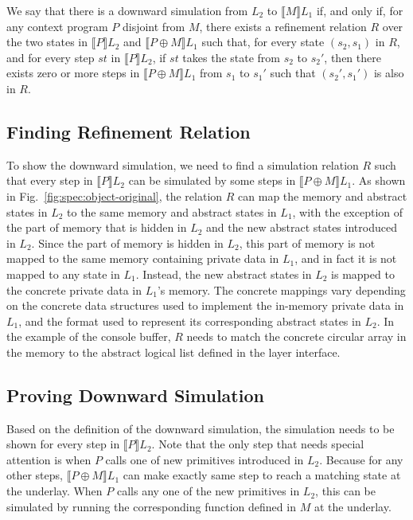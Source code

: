 \begin{definition}
We say that there is a downward simulation from $L_2$ to
$\llbracket{}M\rrbracket{}L_1$ if, and only if, for any
context program $P$ disjoint from $M$, there exists a refinement relation
$R$ over the two states in $\llbracket{}P\rrbracket{}L_2$ and
$\llbracket{}{P \oplus M}\rrbracket{}L_1$ such that, for
every state $(s_2, s_1)$ in $R$, and for every step $st$ in $\llbracket{}P\rrbracket{}L_2$,
if $st$ takes the state from $s_2$ to $s_2'$, then there exists
zero or more steps in $\llbracket{}{P \oplus M}\rrbracket{}L_1$ from
$s_1$ to $s_1'$ such that $(s_2', s_1')$ is also in $R$.
\end{definition}

\subsection{Finding Refinement Relation}

To show the downward simulation, we need to find a simulation relation $R$
such that every step in $\llbracket{}P\rrbracket{}L_2$ can be simulated by
some steps in $\llbracket{}{P \oplus M}\rrbracket{}L_1$.
As shown in Fig.~\ref{fig:spec:object-original}, the relation $R$ can
map the memory and abstract states in $L_2$ to the same memory and abstract
states in $L_1$, with the exception of the part of memory that is hidden in
$L_2$ and the new abstract states introduced in $L_2$. Since the part of
memory is hidden in $L_2$, this part of memory is not mapped to
the same memory containing private data in $L_1$, and in fact it is not
mapped to any state in $L_1$. Instead, the new abstract states in $L_2$
is mapped to the concrete private data in $L_1$'s memory. The concrete
mappings vary depending on the concrete data structures used to implement
the in-memory private data in $L_1$, and the format used to represent
its corresponding abstract states in $L_2$. In the example of the console
buffer, $R$ needs to match the concrete circular array in the memory
to the abstract logical list defined in the layer interface.


\subsection{Proving Downward Simulation}

Based on the definition of the downward simulation, the simulation needs
to be shown for every step in $\llbracket{}P\rrbracket{}L_2$.
Note that the only step that needs special
attention is when $P$ calls one of new primitives introduced in $L_2$.
Because for any other
steps, $\llbracket{}{P \oplus M}\rrbracket{}L_1$ can make exactly same step
to reach a matching state at the underlay.
When $P$ calls any one of the new primitives in $L_2$, this can be simulated
by running the corresponding function defined in $M$ at the underlay.

